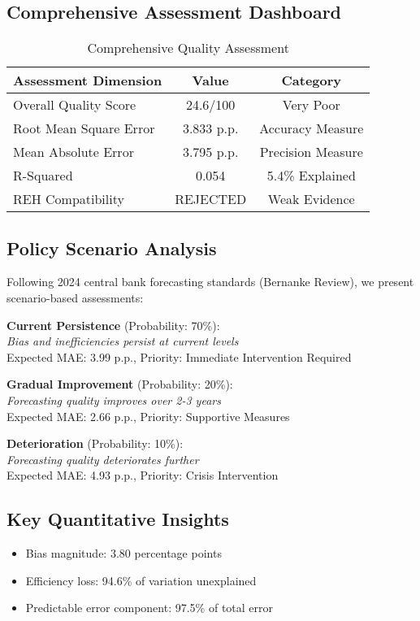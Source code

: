 \documentclass[11pt,a4paper]{article}
\begin{document}
\subsection{Comprehensive Assessment Dashboard}
\begin{table}[H]
  \centering
  \caption{Comprehensive Quality Assessment}
  \begin{tabular}{lcc}
    \toprule
    \textbf{Assessment Dimension} & \textbf{Value}                    & \textbf{Category} \\
    \midrule
    Overall Quality Score         & 24.6/100                          & Very Poor         \\
    Root Mean Square Error        & 3.833 p.p.                        & Accuracy Measure  \\
    Mean Absolute Error           & 3.795 p.p.                        & Precision Measure \\
    R-Squared                     & 0.054                             & 5.4\% Explained   \\
    REH Compatibility             & \textcolor{academicred}{REJECTED} & Weak Evidence     \\
    \bottomrule
  \end{tabular}
\end{table}

\subsection{Policy Scenario Analysis}
Following 2024 central bank forecasting standards (Bernanke Review), we present scenario-based assessments:

\textbf{Current Persistence} (Probability: 70\%):\\
\textit{Bias and inefficiencies persist at current levels}\\
Expected MAE: 3.99 p.p., Priority: Immediate Intervention Required

\textbf{Gradual Improvement} (Probability: 20\%):\\
\textit{Forecasting quality improves over 2-3 years}\\
Expected MAE: 2.66 p.p., Priority: Supportive Measures

\textbf{Deterioration} (Probability: 10\%):\\
\textit{Forecasting quality deteriorates further}\\
Expected MAE: 4.93 p.p., Priority: Crisis Intervention

\subsection{Key Quantitative Insights}
\begin{itemize}
  \item Bias magnitude: 3.80 percentage points
  \item Efficiency loss: 94.6\% of variation unexplained
  \item Predictable error component: 97.5\% of total error
\end{itemize}
\end{document}
